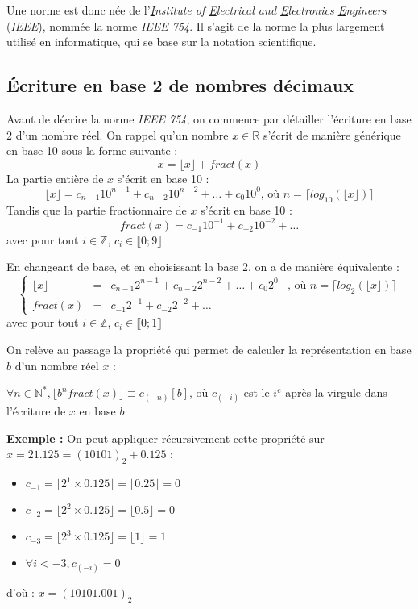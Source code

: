 \documentclass[../../main.tex]{subfiles}
\begin{document}
Une norme est donc née de l'\textit{\underline{I}nstitute of \underline{E}lectrical and \underline{E}lectronics \underline{E}ngineers} (\textit{IEEE}), nommée la norme \textit{IEEE 754}. Il s'agit de la norme la plus largement utilisé en informatique, qui se base sur la notation scientifique.
\subsection{Écriture en base 2 de nombres décimaux}
Avant de décrire la norme \textit{IEEE 754}, on commence par détailler l'écriture en base 2 d'un nombre réel. 
On rappel qu'un nombre $x\in{\mathbb{R}}$ s'écrit de manière générique en base 10 sous la forme suivante :
$$x = \lfloor{x}\rfloor + fract(x)$$
La partie entière de $x$ s'écrit en base 10 : 
$$\lfloor{x}\rfloor = c_{n-1}10^{n-1} + c_{n-2}10^{n-2} + \dots + c_{0}10^{0}\text{, où $n = \lceil log_{10}(\lfloor{x}\rfloor)\rceil$}$$
Tandis que la partie fractionnaire de $x$ s'écrit en base 10 :
$$fract(x) = c_{-1}10^{-1} + c_{-2}10^{-2} + \dots$$
avec pour tout $i\in\mathbb{Z}$, $c_{i}\in{\llbracket{0; 9\rrbracket}}$

En changeant de base, et en choisissant la base 2, on a de manière équivalente :
$$\left\{\begin{array}{lcll}
\lfloor{x}\rfloor & = & c_{n-1}2^{n-1} + c_{n-2}2^{n-2} + \dots + c_{0}2^{0} & \text{, où $n = \lceil log_{2}(\lfloor{x}\rfloor)\rceil$} \\
fract(x) & = & c_{-1}2^{-1} + c_{-2}2^{-2} + \dots
\end{array}\right.$$
avec pour tout $i\in\mathbb{Z}$, $c_{i}\in{\llbracket{0; 1\rrbracket}}$

On relève au passage la propriété qui permet de calculer la représentation en base $b$ d'un nombre réel $x$ :

\proposition{} $\forall{n\in{\mathbb{N}^{*}}}, \lfloor b^{n}fract(x)\rfloor \equiv c_{(-n)}[b]$, où $c_{(-i)}$ est le $i^e$ après la virgule dans l'écriture de $x$ en base $b$.

\textbf{Exemple :} On peut appliquer récursivement cette propriété sur $x = 21.125 = (10101)_{2} + 0.125$ :
\begin{itemize}
     \item $c_{-1} = \lfloor 2^{1}\times{0.125} \rfloor = \lfloor 0.25\rfloor = 0$
     \item $c_{-2} = \lfloor 2^{2}\times{0.125} \rfloor = \lfloor 0.5\rfloor = 0$
     \item $c_{-3} = \lfloor 2^{3}\times{0.125} \rfloor = \lfloor 1\rfloor = 1$
     \item $\forall{i < -3}, c_{(-i)} = 0$
\end{itemize}
d'où : $x = (10101.001)_{2}$
\end{document}
